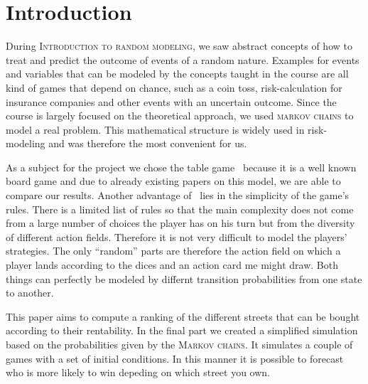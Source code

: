 \section{Introduction} %
\label{sec:introduction}

During \textsc{Introduction to random modeling}, we saw abstract concepts of how to treat and predict the 
outcome of events of a random nature. Examples for events and variables that can be modeled by the 
concepts taught in the course are all kind of games that depend on chance, such as a coin toss, 
risk-calculation for insurance companies and other events with an uncertain outcome. Since the course
is largely focused on the theoretical approach, we used \textsc{markov chains}	 to model 
a real problem. This mathematical structure is widely used in risk-modeling and was therefore the
most convenient for us. 

As a subject for the project we chose the table game \monopoly~because it is a well known board game and 
due to already existing papers on this model, we are able to compare our results. 
Another advantage of \monopoly~lies in the simplicity of the game's rules. 
There is a limited list of rules so that the main complexity does not come from a large number 
of choices the player has on his turn but from the diversity of different action fields. Therefore it is not
very difficult to model the players' strategies. 
The only ``random'' parts are therefore the action field on which a player lands according to the dices
and an action card me might draw. 
Both things can perfectly be modeled by differnt transition probabilities from one state to another.

This paper aims to compute a ranking of the different streets that can be bought according to their rentability. 
In the final part we created a simplified simulation based on the probabilities given by the \textsc{Markov 
chains}.
It simulates a couple of games with a set of initial conditions. In this manner it is possible to forecast
who is more likely to win depeding on which street you own.

